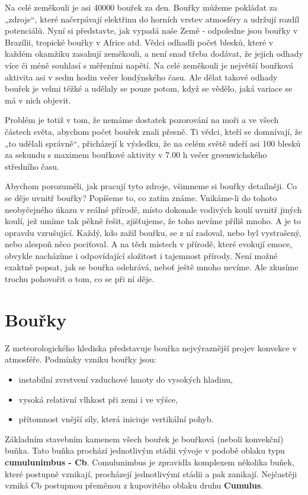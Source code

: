     Na celé zeměkouli je asi \num{40 000} bouřek za den. Bouřky můžeme pokládat za „zdroje“, které
    načerpávají elektřinu do horních vrstev atmosféry a udržují rozdíl potenciálů. Nyní si
    představte, jak vypadá naše Země - odpoledne jsou bouřky v Brazílii, tropické bouřky v Africe
    atd. Vědci odhadli počet blesků, které v každém okamžiku zasahují zeměkouli, a není snad třeba
    dodávat, že jejich odhady více či méně souhlasí s měřeními napětí. Na celé zeměkouli je největší
    bouřková aktivita asi v sedm hodin večer londýnského času. Ale dělat takové odhady bouřek je
    velmi těžké a udělaly se pouze potom, když se vědělo, jaká variace se má v nich objevit.
  
    Problém je totiž v tom, že nemáme dostatek pozorování na moři a ve všech částech světa, abychom
    počet bouřek znali přesně. Ti vědci, kteří se domnívají, že „to udělali správně“, přicházejí k
    výsledku, že na celém světě udeří asi \num{100} blesků za sekundu s maximem bouřkové aktivity v
    7.00 h večer greenwichského středního času.

    Abychom porozuměli, jak pracují tyto zdroje, všimneme si bouřky detailněji. Co se děje uvnitř
    bouřky? Popíšeme to, co zatím známe. Vnikáme-li do tohoto neobyčejného úkazu v reálné přírodě,
    místo dokonale vodivých koulí uvnitř jiných koulí, jež umíme tak pěkně řešit, zjišťujeme, že
    toho nevíme příliš mnoho. A je to opravdu vzrušující. Každý, kdo zažil bouřku, se z ní radoval,
    nebo byl vystrašený, nebo alespoň něco pociťoval. A na těch místech v přírodě, které evokují
    emoce, obvykle nacházíme i odpovídající složitost i tajemnost přírody. Není možné exaktně
    popsat, jak se bouřka odehrává, neboť ještě mnoho nevíme. Ale zkusíme trochu pohovořit o tom, co
    se při ní děje.

  \section{Bouřky}\label{fyz:IIchapIXsecIV} 
    Z meteorologického hlediska představuje bouřka nejvýraznější projev konvekce v atmosféře.
    Podmínky vzniku bouřky jsou:
    \begin{itemize}[noitemsep]
      \item instabilní zvrstvení vzduchové hmoty do vysokých hladinu,
      \item vysoká relativní vlhkost při zemi i ve výšce,
      \item přítomnost vnější síly, která iniciuje vertikální pohyb.
    \end{itemize}
    Základním stavebním kamenem všech bouřek je bouřková (neboli konvekční) buňka. Tato buňka
    prochází jednotlivým stádii vývoje v podobě oblaku typu \textbf{cumulunimbus - Cb}. Comulunimbus
    je zpravidla komplexem několika buňek, které postupně vznikají, procházejí jednotlivými stádii a
    pak zanikají. Nejčastěji vzniká Cb postupnou přeměnou z kupovitého oblaku druhu
    \textbf{Cumulus}.
 
